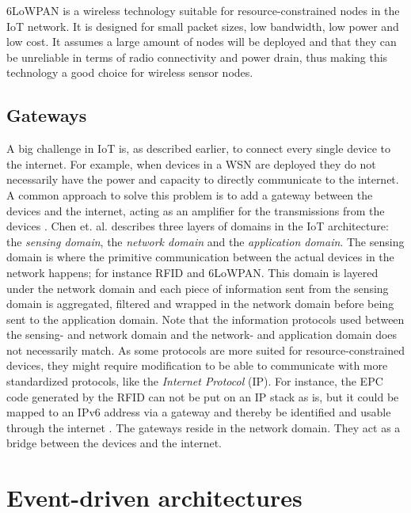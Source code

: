 6LoWPAN is a wireless technology suitable for resource-constrained nodes in the
IoT network. It is designed for small packet sizes, low bandwidth, low power
and low cost. It assumes a large amount of nodes will be deployed and that they
can be unreliable in terms of radio connectivity and power drain, thus making
this technology a good choice for wireless sensor nodes. \cite{kushalnagar2007ipv6}

\subsection{Gateways}

A big challenge in IoT is, as described earlier, to connect every single device
to the internet. For example, when devices in a WSN are deployed they do not
necessarily have the power and capacity to directly communicate to the
internet. A common approach to solve this problem is to add a gateway between
the devices and the internet, acting as an amplifier for the transmissions from
the devices \cite{zhu2010iot}. Chen et. al. \cite{chen2011brief} describes
three layers of domains in the IoT architecture: the \textit{sensing domain},
the \textit{network domain} and the \textit{application domain}. The sensing
domain is where the primitive communication between the actual devices in the
network happens; for instance RFID and 6LoWPAN. This domain is layered under
the network domain and each piece of information sent from the sensing domain
is aggregated, filtered and wrapped in the network domain before being sent to
the application domain. Note that the information protocols used between the
sensing- and network domain and the network- and application domain does not
necessarily match. As some protocols are more suited for resource-constrained
devices, they might require modification to be able to communicate with more
standardized protocols, like the \textit{Internet Protocol} (IP). For instance,
the EPC code generated by the RFID can not be put on an IP stack as is, but it
could be mapped to an IPv6 address via a gateway and thereby be identified and
usable through the internet \cite{lee2007epc}. The gateways reside in the
network domain. They act as a bridge between the devices and the internet.

\section{Event-driven architectures}

